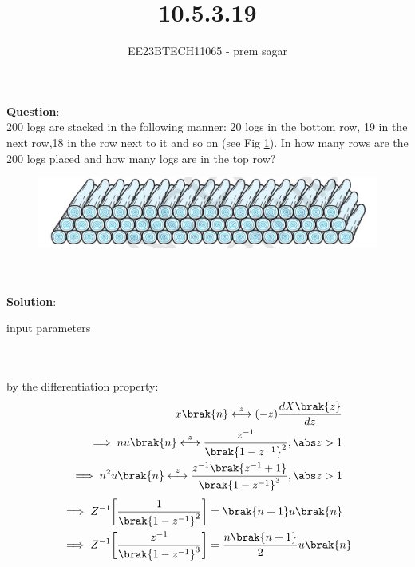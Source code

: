 \documentclass[journal,12pt,twocolumn]{IEEEtran}
\theoremstyle{remark}
\begin{document}

\vspace{3cm}

\title{10.5.3.19}
\author{EE23BTECH11065 - prem sagar}
\maketitle
\newpage

\bigskip 

\renewcommand{\thefigure}{\arabic{figure}}
\renewcommand{\thetable}{\arabic{table}}
\textbf{Question}:\\  200 logs are stacked in the following manner: 20 logs in the bottom row, 19 in the next row,18 in the row next to it and so on (see Fig \ref{fig:10.5.3.19.q}). In how many rows are the 200 logs placed and how many logs are in the top row?
\begin{figure}[h]
    \centering
    \includegraphics[width=1\linewidth]{ncert-maths/10/5/3/19/figs/question.png}
    \caption{ }
    \label{fig:10.5.3.19.q}
\end{figure}
\fi
\\\\\textbf{Solution}:
\begin{table}[!ht]
  \def\arraystretch{1.5}
  \centering
  \renewcommand\thetable{1}
  
  \caption{input parameters}
  \label{tab:10.5.3.19}
  \end{table}
\\\\by the differentiation property:
\\\begin{align}
 x\brak{n}\overset{z}{\longleftrightarrow} (-z)\frac{dX\brak{z}}{dz}
 \\\implies n u\brak{n}\overset{z}{\longleftrightarrow} \frac{z^{-1}}{\brak{1-z^{-1}}^2},\abs z>1
 \label{eq:10.5.3.19.2}
 \\\implies n^2 u\brak{n}\overset{z}{\longleftrightarrow} \frac{z^{-1}\brak{z^{-1}+1}}{\brak{1-z^{-1}}^3} ,\abs z>1
 \end{align}
 \begin{align}
 \implies Z^{-1}\biggl[\frac{1}{\brak{1-z^{-1}}^2}\biggr]&=\brak{n+1}u\brak{n}
 \label{eq:10.5.3.19.4}
\\\implies Z^{-1}\biggl[\frac{z^{-1}}{\brak{1-z^{-1}}^3}\biggr]&=\frac{n\brak{n+1}}{2}u\brak{n}
\label{eq:10.5.3.19.5}
 \end{align}
\end{document}
